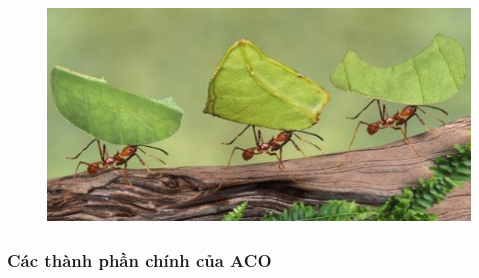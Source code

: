 \documentclass[14pt]{article}
\begin{document}
	\begin{figure}[htbp]
		\centering
		\includegraphics[width=\textwidth]{./Image/IconACO_Cover.png}
		\label{fig:mylabel}
	\end{figure}
	\newpage
	\subsubsection{Các thành phần chính của ACO}
	
\end{document}
